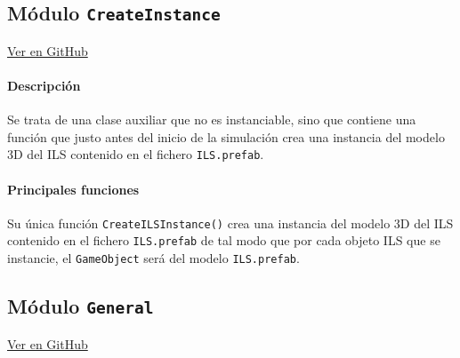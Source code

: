 \subsection{Módulo \texttt{CreateInstance}}
\label{subsec:ClaseCreateInstance}

\vspace{-0.4cm}
\begin{flushright}
\href{https://github.com/macgyver912/atc-simulator/blob/jaime/Assets/Scripts/general/CreateInstance.cs}{Ver en GitHub \faGithub}
\end{flushright}

\paragraph{Descripción} \phantom{\newline}

Se trata de una clase auxiliar que no es instanciable, sino que contiene una función que justo antes del inicio de la simulación crea una instancia del modelo 3D del ILS contenido en el fichero \texttt{ILS.prefab}.

\paragraph{Principales funciones} \phantom{\newline}
Su única función \texttt{CreateILSInstance()} crea una instancia del modelo 3D del ILS contenido en el fichero \texttt{ILS.prefab} de tal modo que por cada objeto ILS que se instancie, el \texttt{GameObject} será del modelo \texttt{ILS.prefab}.






\subsection{Módulo \texttt{General}}
\label{subsec:ClaseGeneral}

\vspace{-0.85cm}
\begin{flushright}
\href{https://github.com/macgyver912/atc-simulator/blob/jaime/Assets/Scripts/general/General.cs}{Ver en GitHub \faGithub}
\end{flushright}

